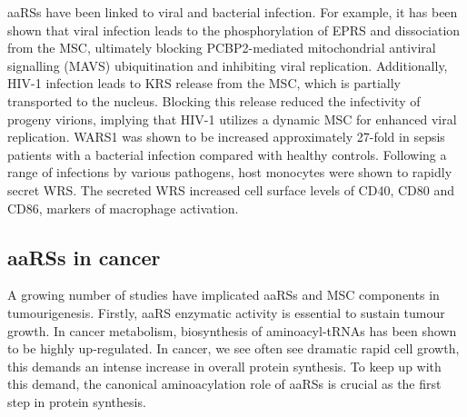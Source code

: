 aaRSs have been linked to viral and bacterial infection.
For example, it has been shown that viral infection leads to the phosphorylation of EPRS and dissociation from the MSC, ultimately blocking PCBP2-mediated mitochondrial antiviral signalling (MAVS) ubiquitination and inhibiting viral replication\cite{lee2016infection}.
Additionally, HIV-1 infection leads to KRS release from the MSC, which is partially transported to the nucleus.
Blocking this release reduced the infectivity of progeny virions, implying that HIV-1 utilizes a dynamic MSC for enhanced viral replication\cite{duchon2017hiv}.
WARS1 was shown to be increased approximately 27-fold in sepsis patients with a bacterial infection compared with healthy controls. Following a range of infections by various pathogens, host monocytes were shown to rapidly secret WRS.
The secreted WRS increased cell surface levels of CD40, CD80 and CD86, markers of macrophage activation\cite{ahn2016secreted}.

\subsection{aaRSs in cancer}
A growing number of studies have implicated aaRSs and MSC components in tumourigenesis.
Firstly, aaRS enzymatic activity is essential to sustain tumour growth. In cancer metabolism, biosynthesis of aminoacyl-tRNAs has been shown to be highly up-regulated\cite{hu2013heterogeneity}.
In cancer, we see often see dramatic rapid cell growth, this demands an intense increase in overall protein synthesis. To keep up with this demand, the canonical aminoacylation role of aaRSs is crucial as the first step in protein synthesis.

